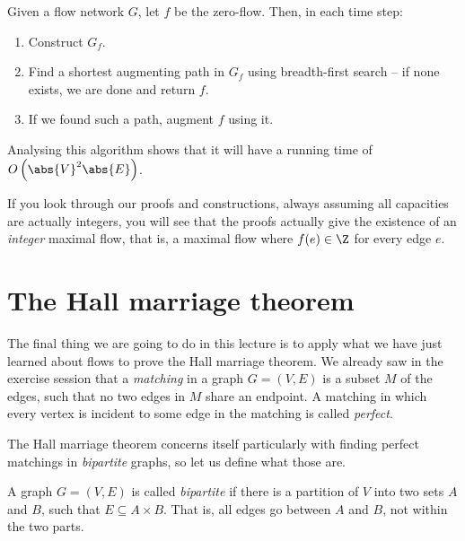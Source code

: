 \documentclass[nobib]{tufte-handout}
\begin{document}
\begin{definition}
    Given a flow network $G$, let $f$ be the zero-flow. Then, in each time step:
    \begin{enumerate}
        \item Construct $G_f$.
        \item Find a shortest augmenting path in $G_f$ using breadth-first search -- if none exists, we are done and return $f$.
        \item If we found such a path, augment $f$ using it.
    \end{enumerate}

    Analysing this algorithm shows that it will have a running time of $O\left(\abs{V}^2\abs{E}\right)$.
\end{definition}

\begin{remark}
    If you look through our proofs and constructions, always assuming all capacities are actually integers, you will see that the proofs actually give the existence of an \emph{integer} maximal flow, that is, a maximal flow where $f(e)\in\Z$ for every edge $e$.
\end{remark}

\section{The Hall marriage theorem}

The final thing we are going to do in this lecture is to apply what we have just learned about flows to prove the Hall marriage theorem. We already saw in the exercise session that a \emph{matching} in a graph $G = (V,E)$ is a subset $M$ of the edges, such that no two edges in $M$ share an endpoint. A matching in which every vertex is incident to some edge in the matching is called \emph{perfect}.

The Hall marriage theorem concerns itself particularly with finding perfect matchings in \emph{bipartite} graphs, so let us define what those are.

\begin{definition}
    A graph $G = (V, E)$ is called \emph{bipartite} if there is a partition of $V$ into two sets $A$ and $B$, such that $E \subseteq A \times B$. That is, all edges go between $A$ and $B$, not within the two parts.
\end{definition}
\end{document}
